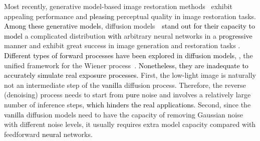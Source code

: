 \documentclass[10pt,twocolumn,letterpaper]{article}
\newcommand{\wh}[1]{\textcolor{black}{#1}}
\begin{document}
Most recently, generative model-based image restoration methods~\cite{lugmayr2020srflow, wang2021low, saharia2022image} exhibit appealing performance and \wh{pleasing} perceptual quality in image restoration tasks. 
\wh{Among these generative models}, diffusion models~\cite{song2020denoising, ho2020denoising}~\wh{stand out for their capacity to model} a complicated distribution \wh{with} arbitrary neural networks in a \wh{progressive} manner and exhibit great success in image generation and restoration tasks \cite{saharia2022image}.
\wh{Different types of forward processes have been explored in diffusion models}, \eg, the unified framework for the Wiener process~\cite{zhang2022gddim}.
\wh{Nonetheless, they are inadequate to accurately simulate real exposure processes.}
First, the low-light image is naturally not an intermediate step of the \wh{vanilla} diffusion process. Therefore, the reverse (denoising) process needs to start from \wh{pure} noise and involves a relatively large number of inference steps, \wh{which hinders the real applications.}
Second, since the \wh{vanilla} diffusion models need to have the capacity of removing Gaussian noise with different noise levels, it usually requires extra model capacity compared with feedforward \wh{neural} networks.
\end{document}
